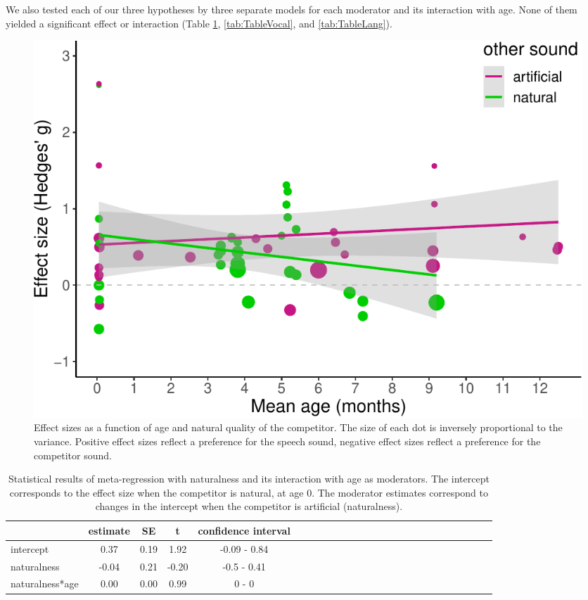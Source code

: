 \documentclass[man]{apa6}
\begin{document}
We also tested each of our three hypotheses by three separate models for each moderator and its interaction with age. None of them yielded a significant effect or interaction (Table \ref{tab:TableNatural}, \ref{tab:TableVocal}, and \ref{tab:TableLang}).

\begin{figure}
\centering
\includegraphics{MA_speech_pref_files/figure-latex/natural-1.pdf}
\caption{\label{fig:natural}Effect sizes as a function of age and natural quality of the competitor. The size of each dot is inversely proportional to the variance. Positive effect sizes reflect a preference for the speech sound, negative effect sizes reflect a preference for the competitor sound.}
\end{figure}

\begin{table}[tbp]
\begin{center}
\begin{threeparttable}
\caption{\label{tab:TableNatural}Statistical results of meta-regression with naturalness and its interaction with age as moderators. The intercept corresponds to the effect size when the competitor is natural, at age 0. The moderator estimates correspond to changes in the intercept when the competitor is artificial (naturalness).}
\begin{tabular}{lcccclcccclcccclcccclcccc}
\toprule
 & estimate & SE & t & confidence interval\\
\midrule
intercept & 0.37 & 0.19 & 1.92 & -0.09 - 0.84\\
naturalness & -0.04 & 0.21 & -0.20 & -0.5 - 0.41\\
naturalness*age & 0.00 & 0.00 & 0.99 & 0 - 0\\
\bottomrule
\end{tabular}
\end{threeparttable}
\end{center}
\end{table}
\end{document}
